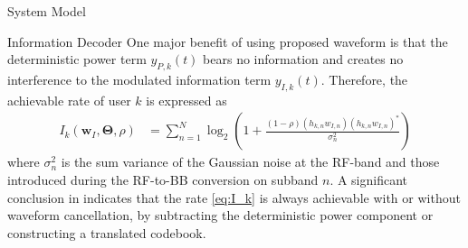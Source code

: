 \documentclass{IEEEtran}
\begin{document}
\begin{section} {System Model}
	\begin{subsection}	{Information Decoder}
		One major benefit of using proposed waveform is that the deterministic power term $y_{P,k}(t)$ bears no information and creates no interference to the modulated information term $y_{I,k}(t)$. Therefore, the achievable rate of user $k$ is expressed as
		\begin{equation}	\label{eq:I_k}
			\begin{split}
				I_k(\boldsymbol{w}_I,\boldsymbol{\Theta},\rho)
				&=\sum_{n=1}^N{\log_2\left(1+\frac{(1-\rho)(h_{k,n}w_{I,n})(h_{k,n}w_{I,n})^*}{\sigma_n^2}\right)}
			\end{split}
		\end{equation}
		where $\sigma_n^2$ is the sum variance of the Gaussian noise at the RF-band and those introduced during the RF-to-BB conversion on subband $n$. A significant conclusion in \cite{Clerckx2018b} indicates that the rate \ref{eq:I_k} is always achievable with or without waveform cancellation, by subtracting the deterministic power component or constructing a translated codebook.
	\end{subsection}


\end{section}
\end{document}
